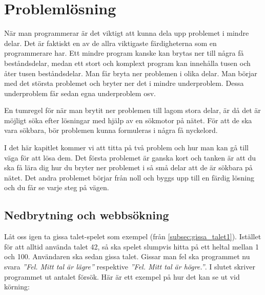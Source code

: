 %
%

\chapter{Problemlösning}\label{ch:problemlosning}
När man programmerar är det viktigt att kunna dela upp problemet i mindre delar. Det är faktiskt en av de allra viktigaste färdigheterna som en programmerare har. Ett mindre program kanske kan brytas ner till några få beståndsdelar, medan ett stort och komplext program kan innehålla tusen och åter tusen beståndsdelar. Man får bryta ner problemen i olika delar. Man börjar med det största problemet och bryter ner det i mindre underproblem. Dessa underproblem får sedan egna underproblem osv.

En tumregel för när man brytit ner problemen till lagom stora delar, är då det är möjligt söka efter lösningar med hjälp av en sökmotor på nätet. För att de ska vara sökbara, bör problemen kunna formuleras i några få nyckelord.

I det här kapitlet kommer vi att titta på två problem och hur man kan gå till väga för att lösa dem. Det första problemet är ganska kort och tanken är att du ska få lära dig hur du bryter ner problemet i så små delar att de är sökbara på nätet. Det andra problemet börjar från noll och byggs upp till en färdig lösning och du får se varje steg på vägen.


\section{Nedbrytning och webbsökning}
Låt oss igen ta gissa talet-spelet som exempel (från \autoref{subsec:gissa_talet1}). Istället för att alltid använda talet 42, så ska spelet slumpvis hitta på ett heltal mellan 1 och 100. Användaren ska sedan gissa talet. Gissar man fel ska programmet nu svara \emph{''Fel. Mitt tal är lägre''} respektive \emph{''Fel. Mitt tal är högre.''}. I slutet skriver programmet ut antalet försök.
\newpage
Här är ett exempel på hur det kan se ut vid körning:

